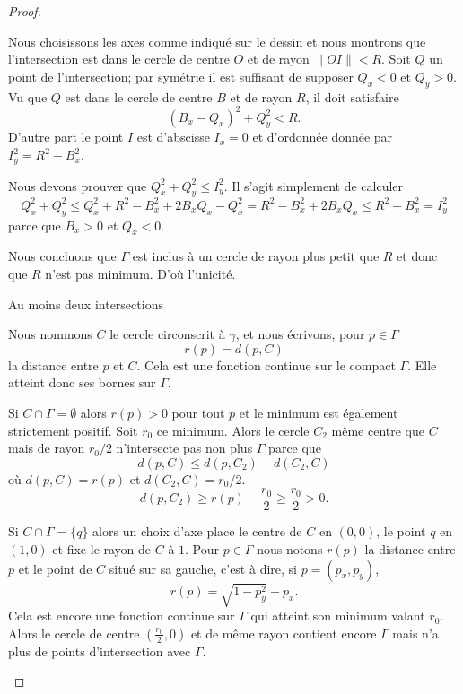 \begin{proof}
\begin{subproof}
        Nous choisissons les axes comme indiqué sur le dessin et nous montrons que l'intersection est dans le cercle de centre \( O\) et de rayon \( \| OI \|<R\). Soit \( Q\) un point de l'intersection; par symétrie il est suffisant de supposer \( Q_x<0\) et \( Q_y>0\). Vu que \( Q\) est dans le cercle de centre \( B\) et de rayon \( R\), il doit satisfaire
        \begin{equation}
            (B_x-Q_x)^2+Q_{y}^2<R.
        \end{equation}
        D'autre part le point \( I\) est d'abscisse \( I_x=0\) et d'ordonnée donnée par \( I_y^2=R^2-B_x^2\). 

        Nous devons prouver que \( Q_x^2+Q_y^2\leq I_y^2\). Il s'agit simplement de calculer
        \begin{equation}
            Q_x^2+Q_y^2\leq Q_x^2+R^2-B_x^2+2B_xQ_x-Q_x^2=R^2-B_x^2+2B_xQ_x\leq R^2-B_x^2=I_y^2
        \end{equation}
        parce que \( B_x>0\) et \( Q_x<0\).

        Nous concluons que \( \Gamma\) est inclus à un cercle de rayon plus petit que \( R\) et donc que \( R\) n'est pas minimum. D'où l'unicité.

    \item[Au moins deux intersections]

        Nous nommons \( C\) le cercle circonscrit à \( \gamma\), et nous écrivons, pour \( p\in \Gamma\) 
        \begin{equation}
            r(p)=d(p,C)
        \end{equation}
        la distance entre \( p\) et \( C\). Cela est une fonction continue sur le compact \( \Gamma\). Elle atteint donc ses bornes sur \( \Gamma\). 

        Si \( C\cap \Gamma=\emptyset\) alors \( r(p)>0\) pour tout \( p\) et le minimum est également strictement positif. Soit \( r_0\) ce minimum. Alors le cercle \( C_2\) même centre que \( C\) mais de rayon \( r_0/2\) n'intersecte pas non plus \( \Gamma\) parce que
        \begin{equation}
            d(p,C)\leq d(p,C_2)+d(C_2,C)
        \end{equation}
        où \( d(p,C)=r(p)\) et \( d(C_2,C)=r_0/2\).
        \begin{equation}
            d(p,C_2)\geq r(p)-\frac{ r_0 }{2}\geq \frac{ r_0 }{2}>0.
        \end{equation}

        Si \( C\cap \Gamma=\{ q \}\) alors un choix d'axe place le centre de \( C\) en \( (0,0)\), le point \( q\) en \( (1,0)\) et fixe le rayon de \( C\) à \( 1\). Pour \( p\in \Gamma\) nous notons \( r(p)\) la distance entre \( p\) et le point de \( C\) situé sur sa gauche, c'est à dire, si \( p=(p_x,p_y)\),
        \begin{equation}
            r(p)=\sqrt{ 1-p_y^2 }+p_x.
        \end{equation}
        Cela est encore une fonction continue sur \( \Gamma\) qui atteint son minimum valant \( r_0\). Alors le cercle de centre \( (\frac{ r_0 }{2},0)\) et de même rayon contient encore \( \Gamma\) mais n'a plus de points d'intersection avec \( \Gamma\).


\end{subproof}
\end{proof}
